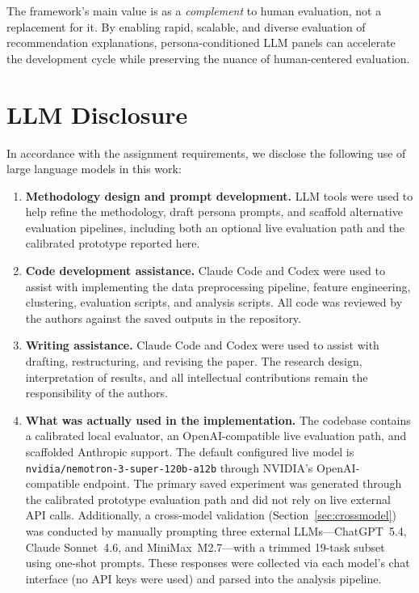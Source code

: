 \documentclass[sigconf,nonacm]{acmart}
\begin{document}
The framework's main value is as a \textit{complement} to human evaluation, not a replacement for it. By enabling rapid, scalable, and diverse evaluation of recommendation explanations, persona-conditioned LLM panels can accelerate the development cycle while preserving the nuance of human-centered evaluation.

\section{LLM Disclosure}
\label{sec:llm_disclosure}

In accordance with the assignment requirements, we disclose the following use of large language models in this work:

\begin{enumerate}[leftmargin=*]
\item \textbf{Methodology design and prompt development.} LLM tools were used to help refine the methodology, draft persona prompts, and scaffold alternative evaluation pipelines, including both an optional live evaluation path and the calibrated prototype reported here.

\item \textbf{Code development assistance.} Claude Code and Codex were used to assist with implementing the data preprocessing pipeline, feature engineering, clustering, evaluation scripts, and analysis scripts. All code was reviewed by the authors against the saved outputs in the repository.

\item \textbf{Writing assistance.} Claude Code and Codex were used to assist with drafting, restructuring, and revising the paper. The research design, interpretation of results, and all intellectual contributions remain the responsibility of the authors.

\item \textbf{What was actually used in the implementation.} The codebase contains a calibrated local evaluator, an OpenAI-compatible live evaluation path, and scaffolded Anthropic support. The default configured live model is \texttt{nvidia/nemotron-3-super-120b-a12b} through NVIDIA's OpenAI-compatible endpoint. The primary saved experiment was generated through the calibrated prototype evaluation path and did not rely on live external API calls. Additionally, a cross-model validation (Section~\ref{sec:crossmodel}) was conducted by manually prompting three external LLMs---ChatGPT~5.4, Claude Sonnet~4.6, and MiniMax~M2.7---with a trimmed 19-task subset using one-shot prompts. These responses were collected via each model's chat interface (no API keys were used) and parsed into the analysis pipeline.
\end{enumerate}
\end{document}
